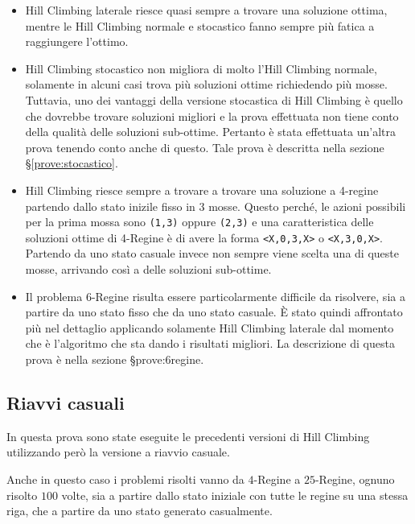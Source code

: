 \begin{itemize}

\item Hill Climbing laterale riesce quasi sempre a trovare una soluzione ottima, mentre le Hill Climbing normale e stocastico fanno sempre più fatica a raggiungere l'ottimo.

\item Hill Climbing stocastico non migliora di molto l'Hill Climbing normale, solamente in alcuni casi trova più soluzioni ottime richiedendo più mosse. Tuttavia, uno dei vantaggi della versione stocastica di Hill Climbing è quello che dovrebbe trovare soluzioni migliori e la prova effettuata non tiene conto della qualità delle soluzioni sub-ottime. Pertanto è stata effettuata un'altra prova tenendo conto anche di questo. Tale prova è descritta nella sezione §\ref{prove:stocastico}.

\item Hill Climbing riesce sempre a trovare a trovare una soluzione a 4-regine partendo dallo stato inizile fisso in 3 mosse. Questo perché, le azioni possibili per la prima mossa sono \texttt{(1,3)} oppure \texttt{(2,3)} e una caratteristica delle soluzioni ottime di 4-Regine è di avere la forma \texttt{<X,0,3,X>} o \texttt{<X,3,0,X>}. Partendo da uno stato casuale invece non sempre viene scelta una di queste mosse, arrivando così a delle soluzioni sub-ottime. 

\item Il problema 6-Regine risulta essere particolarmente difficile da risolvere, sia a partire da uno stato fisso che da uno stato casuale. \`{E} stato quindi affrontato più nel dettaglio applicando solamente Hill Climbing laterale dal momento che è l'algoritmo che sta dando i risultati migliori. La descrizione di questa prova è nella sezione §{prove:6regine}.
\end{itemize}




\subsection{Riavvi casuali}

In questa prova sono state eseguite le precedenti versioni di Hill Climbing utilizzando però la versione a riavvio casuale.

Anche in questo caso i problemi risolti vanno da $4$-Regine a $25$-Regine, ognuno risolto $100$ volte, sia a partire dallo stato iniziale con tutte le regine su una stessa riga, che a partire da uno stato generato casualmente.

